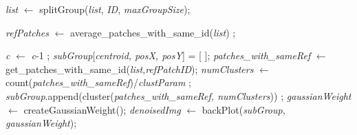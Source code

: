 \documentclass[fleqn,10pt]{wlscirep}
\begin{document}
\begin{algorithm}
\begin{algorithmic}[1]
		
		\State \textit{list} $\gets$ splitGroup(\textit{list}, \textit{ID}, \textit{maxGroupSize});
		
		
		\EndIf
		
		\EndFor
		
		\State \textit{refPatches} $\gets$ average\_patches\_with\_same\_id(\textit{list}) ;
		
		\State \textit{c} $\gets$ \textit{c}-1 ;
		\EndFor
		\State \textit{subGroup}[\textit{centroid, posX, posY}] = [ ];
		\State \textit{patches\_with\_sameRef} $\gets$ get\_patches\_with\_same\_id(\textit{list},\textit{refPatchID});
		\State \textit{numClusters} $\gets$ count(\textit{patches\_with\_sameRef})/\textit{clustParam} ;
		\State \textit{subGroup}.append(cluster(\textit{patches\_with\_sameRef, numClusters})) ;
		\EndFor
		\State \textit{gaussianWeight} $\gets$ createGaussianWeight();
		\State \textit{denoisedImg} $\gets$ backPlot(\textit{subGroup}, \textit{gaussianWeight});
	\end{algorithmic}
\end{algorithm}

\clearpage

\end{document}

